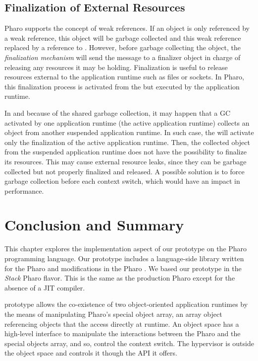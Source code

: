 \subsection{Finalization of External Resources}

Pharo \VM supports the concept of weak references. If an object is only referenced by a weak reference, this object will be garbage collected and this weak reference replaced by a reference to . However, before garbage collecting the object, the \emph{finalization mechanism} will send the  message to a finalizer object in charge of releasing any resources it may be holding. Finalization is useful to release resources external to the application runtime such as files or sockets. In Pharo, this finalization process is activated from the \VM but executed by the application runtime.

In \Vtt and because of the shared garbage collection, it may happen that a GC activated by one application runtime (the active application runtime) collects an object from another suspended application runtime. In such case, the \VM will activate only the finalization of the active application runtime. Then, the collected object from the suspended application runtime does not have the possibility to finalize its resources. This may cause external resource leaks, since they can be garbage collected but not properly finalized and released. A possible solution is to force garbage collection before each context switch, which would have an impact in performance.

\section{Conclusion and Summary}

This chapter explores the implementation aspect of our \Vtt prototype on the Pharo programming language. Our prototype includes a language-side library written for the Pharo and modifications in the Pharo \VM. We based our prototype in the \emph{Stack} Pharo \VM flavor. This \VM is the same as the production Pharo \VM except for the absence of a JIT compiler.

\Vtt prototype allows the co-existence of two object-oriented application runtimes by the means of manipulating Pharo's special object array, an array object referencing objects that the \VM access directly at runtime. An object space has a high-level interface to manipulate the interactions between the Pharo \VM and the special objects array, and so, control the context switch. The hypervisor is outside the object space and controls it though the API it offers.

